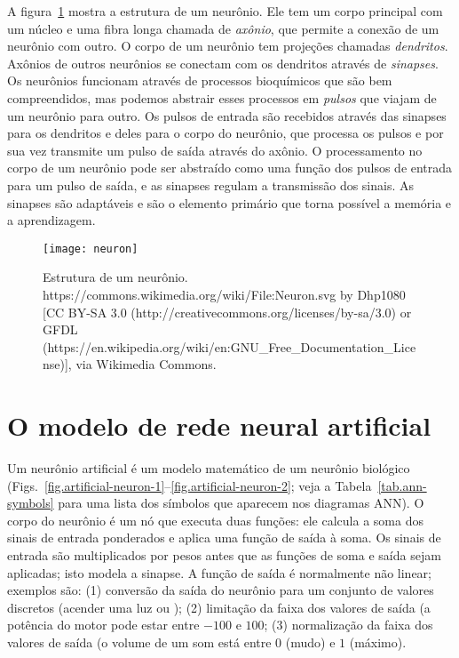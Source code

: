 A figura~\ref{fig.neuron} mostra a estrutura de um neurônio. Ele tem um corpo principal com um núcleo e uma fibra longa chamada de \emph{axônio}, que permite a conexão de um neurônio com outro. O corpo de um neurônio tem projeções chamadas \emph{dendritos}. Axônios de outros neurônios se conectam com os dendritos através de \emph{sinapses}. Os neurônios funcionam através de processos bioquímicos que são bem compreendidos, mas podemos abstrair esses processos em \emph{pulsos} que viajam de um neurônio para outro. Os pulsos de entrada são recebidos através das sinapses para os dendritos e deles para o corpo do neurônio, que processa os pulsos e por sua vez transmite um pulso de saída através do axônio. O processamento no corpo de um neurônio pode ser abstraído como uma função dos pulsos de entrada para um pulso de saída, e as sinapses regulam a transmissão dos sinais. As sinapses são adaptáveis e são o elemento primário que torna possível a memória e a aprendizagem.

\begin{figure}
\begin{center}
\texttt{[image: neuron]}
\end{center}
\caption{Estrutura de um neurônio.\\https://commons.wikimedia.org/wiki/File:Neuron.svg by Dhp1080 [CC BY-SA 3.0 (http://creativecommons.org/licenses/by-sa/3.0) or GFDL (https://en.wikipedia.org/wiki/en:GNU\_Free\_Documentation\_License)], via Wikimedia Commons.
}\label{fig.neuron}
\end{figure}

\section{O modelo de rede neural artificial}\label{s.ann}

Um neurônio artificial é um modelo matemático de um neurônio biológico (Figs.~\ref{fig.artificial-neuron-1}--\ref{fig.artificial-neuron-2}; veja a Tabela~\ref{tab.ann-symbols} para uma lista dos símbolos que aparecem nos diagramas ANN). O corpo do neurônio é um nó que executa duas funções: ele calcula a soma dos sinais de entrada ponderados e aplica uma função de saída à soma. Os sinais de entrada são multiplicados por pesos antes que as funções de soma e saída sejam aplicadas; isto modela a sinapse. A função de saída é normalmente não linear; exemplos são: (1) conversão da saída do neurônio para um conjunto de valores discretos (acender uma luz  ou ); (2) limitação da faixa dos valores de saída (a potência do motor pode estar entre $-100$ e $100$; (3) normalização da faixa dos valores de saída (o volume de um som está entre $0$ (mudo) e $1$ (máximo).

